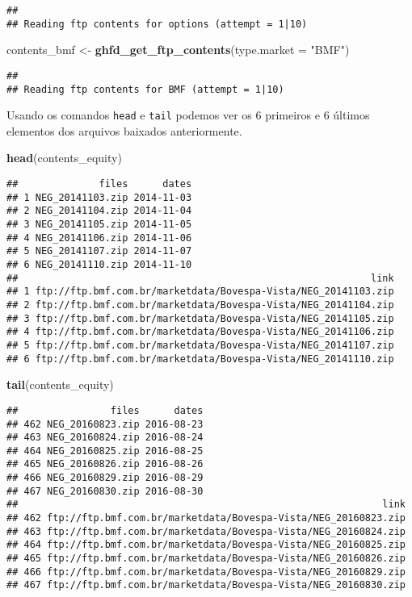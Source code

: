 \documentclass[]{article}
\newenvironment{Shaded}{\begin{snugshade}}{\end{snugshade}}
\newcommand{\KeywordTok}[1]{\textcolor[rgb]{0.13,0.29,0.53}{\textbf{{#1}}}}
\newcommand{\DataTypeTok}[1]{\textcolor[rgb]{0.13,0.29,0.53}{{#1}}}
\newcommand{\StringTok}[1]{\textcolor[rgb]{0.31,0.60,0.02}{{#1}}}
\newcommand{\NormalTok}[1]{{#1}}
\begin{document}
\begin{verbatim}
## 
## Reading ftp contents for options (attempt = 1|10)
\end{verbatim}

\begin{Shaded}
\begin{Highlighting}[]
\NormalTok{contents_bmf <-}\StringTok{ }\KeywordTok{ghfd_get_ftp_contents}\NormalTok{(}\DataTypeTok{type.market =} \StringTok{"BMF"}\NormalTok{)}
\end{Highlighting}
\end{Shaded}

\begin{verbatim}
## 
## Reading ftp contents for BMF (attempt = 1|10)
\end{verbatim}

Usando os comandos \texttt{head} e \texttt{tail} podemos ver os 6
primeiros e 6 últimos elementos dos arquivos baixados anteriormente.

\begin{Shaded}
\begin{Highlighting}[]
\KeywordTok{head}\NormalTok{(contents_equity)}
\end{Highlighting}
\end{Shaded}

\begin{verbatim}
##              files      dates
## 1 NEG_20141103.zip 2014-11-03
## 2 NEG_20141104.zip 2014-11-04
## 3 NEG_20141105.zip 2014-11-05
## 4 NEG_20141106.zip 2014-11-06
## 5 NEG_20141107.zip 2014-11-07
## 6 NEG_20141110.zip 2014-11-10
##                                                             link
## 1 ftp://ftp.bmf.com.br/marketdata/Bovespa-Vista/NEG_20141103.zip
## 2 ftp://ftp.bmf.com.br/marketdata/Bovespa-Vista/NEG_20141104.zip
## 3 ftp://ftp.bmf.com.br/marketdata/Bovespa-Vista/NEG_20141105.zip
## 4 ftp://ftp.bmf.com.br/marketdata/Bovespa-Vista/NEG_20141106.zip
## 5 ftp://ftp.bmf.com.br/marketdata/Bovespa-Vista/NEG_20141107.zip
## 6 ftp://ftp.bmf.com.br/marketdata/Bovespa-Vista/NEG_20141110.zip
\end{verbatim}

\begin{Shaded}
\begin{Highlighting}[]
\KeywordTok{tail}\NormalTok{(contents_equity)}
\end{Highlighting}
\end{Shaded}

\begin{verbatim}
##                files      dates
## 462 NEG_20160823.zip 2016-08-23
## 463 NEG_20160824.zip 2016-08-24
## 464 NEG_20160825.zip 2016-08-25
## 465 NEG_20160826.zip 2016-08-26
## 466 NEG_20160829.zip 2016-08-29
## 467 NEG_20160830.zip 2016-08-30
##                                                               link
## 462 ftp://ftp.bmf.com.br/marketdata/Bovespa-Vista/NEG_20160823.zip
## 463 ftp://ftp.bmf.com.br/marketdata/Bovespa-Vista/NEG_20160824.zip
## 464 ftp://ftp.bmf.com.br/marketdata/Bovespa-Vista/NEG_20160825.zip
## 465 ftp://ftp.bmf.com.br/marketdata/Bovespa-Vista/NEG_20160826.zip
## 466 ftp://ftp.bmf.com.br/marketdata/Bovespa-Vista/NEG_20160829.zip
## 467 ftp://ftp.bmf.com.br/marketdata/Bovespa-Vista/NEG_20160830.zip
\end{verbatim}
\end{document}
